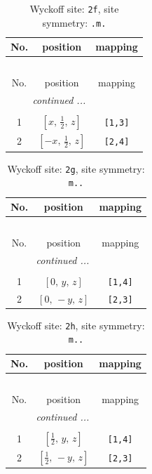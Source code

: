 \documentclass[fleqn,8pt]{jsarticle}
\begin{document}
\renewcommand{\arraystretch}{1.2}
\begin{longtable}{ccc}
\caption{Wyckoff site: {\tt 2f}, site symmetry: {\tt .m.}}
 \\
 \hline \hline
No. & position & mapping \\ \hline \endfirsthead

\multicolumn{2}{l}{\tablename\ \thetable{}} \\
 \hline \hline
No. & position & mapping \\ \hline \endhead

 \hline \hline
\multicolumn{2}{r}{\footnotesize\it continued ...} \\ \endfoot

 \hline \hline
\multicolumn{2}{r}{} \\ \endlastfoot

1 & $\left[ x,\, \frac{1}{2},\, z \right]$ & {\tt [1,3]} \\ \hline
2 & $\left[ - x,\, \frac{1}{2},\, z \right]$ & {\tt [2,4]} \\
\end{longtable}
\renewcommand{\arraystretch}{1.2}
\begin{longtable}{ccc}
\caption{Wyckoff site: {\tt 2g}, site symmetry: {\tt m..}}
 \\
 \hline \hline
No. & position & mapping \\ \hline \endfirsthead

\multicolumn{2}{l}{\tablename\ \thetable{}} \\
 \hline \hline
No. & position & mapping \\ \hline \endhead

 \hline \hline
\multicolumn{2}{r}{\footnotesize\it continued ...} \\ \endfoot

 \hline \hline
\multicolumn{2}{r}{} \\ \endlastfoot

1 & $\left[ 0,\, y,\, z \right]$ & {\tt [1,4]} \\ \hline
2 & $\left[ 0,\, - y,\, z \right]$ & {\tt [2,3]} \\
\end{longtable}
\renewcommand{\arraystretch}{1.2}
\begin{longtable}{ccc}
\caption{Wyckoff site: {\tt 2h}, site symmetry: {\tt m..}}
 \\
 \hline \hline
No. & position & mapping \\ \hline \endfirsthead

\multicolumn{2}{l}{\tablename\ \thetable{}} \\
 \hline \hline
No. & position & mapping \\ \hline \endhead

 \hline \hline
\multicolumn{2}{r}{\footnotesize\it continued ...} \\ \endfoot

 \hline \hline
\multicolumn{2}{r}{} \\ \endlastfoot

1 & $\left[ \frac{1}{2},\, y,\, z \right]$ & {\tt [1,4]} \\ \hline
2 & $\left[ \frac{1}{2},\, - y,\, z \right]$ & {\tt [2,3]} \\
\end{longtable}
\end{document}
